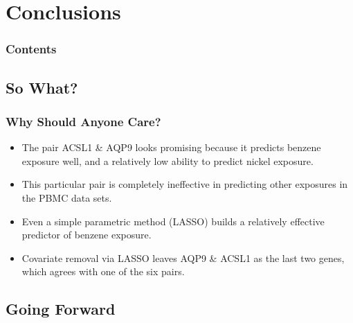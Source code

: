 \documentclass{beamer}
\begin{document}
\section{Conclusions}

\begin{frame}
        \frametitle{Contents}
        \tableofcontents[currentsection,currentsubsection,hideothersubsections,sectionstyle=show/shaded]
\end{frame}

\subsection{So What?}

\begin{frame}[fragile]
  	\frametitle{Why Should Anyone Care?}
 		\begin{itemize}
			\item The pair ACSL1 \& AQP9 looks promising because it predicts benzene exposure well, and a relatively low ability to predict nickel exposure. 
			\item This particular pair is completely ineffective in predicting other exposures in the PBMC data sets.
			\item Even a simple parametric method (LASSO) builds a relatively effective predictor of benzene exposure.
			\item Covariate removal via LASSO leaves AQP9 \& ACSL1 as the last two genes, which agrees with one of the six pairs. 
		\end{itemize}
\end{frame}

\subsection{Going Forward}
\end{document}
